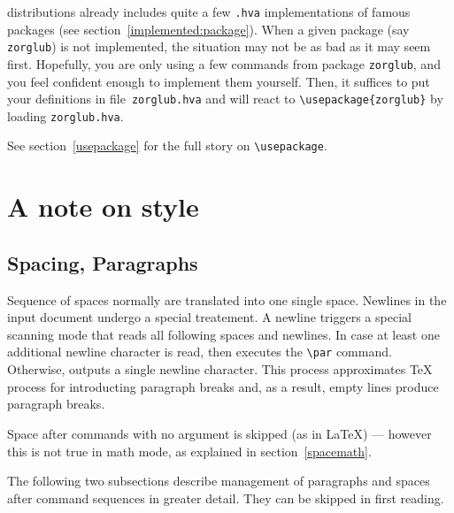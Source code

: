 \hevea{} distributions already includes quite a few \texttt{.hva}
implementations of famous packages (see section~\ref{implemented:package}).
When a given package (say  \texttt{zorglub}) is not implemented, the
situation may not be as bad as it may seem first.
Hopefully, you are only using a few commands from package
\texttt{zorglub}, and you feel confident enough to implement
them yourself.
Then, it suffices to put your definitions in file~\texttt{zorglub.hva}
and \hevea{} will react to \verb+\usepackage{zorglub}+ by loading
\texttt{zorglub.hva}.

See section~\ref{usepackage} for the full story on \verb+\usepackage+.


\section{A note on style}

\subsection{Spacing, Paragraphs}
Sequence of spaces normally are translated into one single space.
Newlines in the input document undergo a special treatement.
A newline triggers a special scanning mode that reads all following
spaces and newlines. In case at least one additional newline character
is read, then \hevea{} executes the \verb+\par+ command.
Otherwise, \hevea{} outputs a single newline character.
This process approximates \TeX{} process for introducting paragraph
breaks and, as a result, empty lines produce paragraph breaks.

Space after commands with no argument is skipped (as in \LaTeX{}) ---
however this is not true in math mode, as explained in
section~\ref{spacemath}.

The following two subsections describe management of paragraphs and
spaces after command sequences in greater detail.
They can be skipped in first reading.

